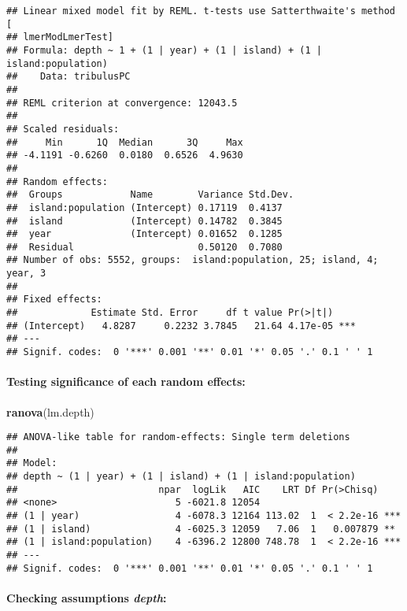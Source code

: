 \documentclass[
]{article}
\newenvironment{Shaded}{\begin{snugshade}}{\end{snugshade}}
\newcommand{\KeywordTok}[1]{\textcolor[rgb]{0.13,0.29,0.53}{\textbf{#1}}}
\newcommand{\NormalTok}[1]{#1}
\begin{document}
\begin{verbatim}
## Linear mixed model fit by REML. t-tests use Satterthwaite's method [
## lmerModLmerTest]
## Formula: depth ~ 1 + (1 | year) + (1 | island) + (1 | island:population)
##    Data: tribulusPC
## 
## REML criterion at convergence: 12043.5
## 
## Scaled residuals: 
##     Min      1Q  Median      3Q     Max 
## -4.1191 -0.6260  0.0180  0.6526  4.9630 
## 
## Random effects:
##  Groups            Name        Variance Std.Dev.
##  island:population (Intercept) 0.17119  0.4137  
##  island            (Intercept) 0.14782  0.3845  
##  year              (Intercept) 0.01652  0.1285  
##  Residual                      0.50120  0.7080  
## Number of obs: 5552, groups:  island:population, 25; island, 4; year, 3
## 
## Fixed effects:
##             Estimate Std. Error     df t value Pr(>|t|)    
## (Intercept)   4.8287     0.2232 3.7845   21.64 4.17e-05 ***
## ---
## Signif. codes:  0 '***' 0.001 '**' 0.01 '*' 0.05 '.' 0.1 ' ' 1
\end{verbatim}

\hypertarget{testing-significance-of-each-random-effects-2}{%
\paragraph{Testing significance of each random
effects:}\label{testing-significance-of-each-random-effects-2}}

\begin{Shaded}
\begin{Highlighting}[]
\KeywordTok{ranova}\NormalTok{(lm.depth)}
\end{Highlighting}
\end{Shaded}

\begin{verbatim}
## ANOVA-like table for random-effects: Single term deletions
## 
## Model:
## depth ~ (1 | year) + (1 | island) + (1 | island:population)
##                         npar  logLik   AIC    LRT Df Pr(>Chisq)    
## <none>                     5 -6021.8 12054                         
## (1 | year)                 4 -6078.3 12164 113.02  1  < 2.2e-16 ***
## (1 | island)               4 -6025.3 12059   7.06  1   0.007879 ** 
## (1 | island:population)    4 -6396.2 12800 748.78  1  < 2.2e-16 ***
## ---
## Signif. codes:  0 '***' 0.001 '**' 0.01 '*' 0.05 '.' 0.1 ' ' 1
\end{verbatim}

\hypertarget{checking-assumptions-depth}{%
\paragraph{\texorpdfstring{Checking assumptions
\emph{depth}:}{Checking assumptions depth:}}\label{checking-assumptions-depth}}
\end{document}
